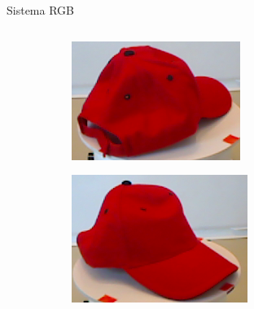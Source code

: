 \documentclass[]{beamer}
\begin{document}
\begin{frame}[fragile]{Sistema RGB}
\begin{columns}
\begin{column}{0.6\textwidth}
{\begin{figure}
                	\begin{subfigure}[b]{0.4\textwidth}
                		\includegraphics[width=\textwidth]{img/templates/180_crop.png}
                	\end{subfigure}
                	\quad
                	\begin{subfigure}[b]{0.4\textwidth}
                		\includegraphics[width=\textwidth]{img/templates/270_crop.png}
                	\end{subfigure}
                \end{figure}
            }

\end{column}
\end{columns}
\end{frame}
\end{document}
